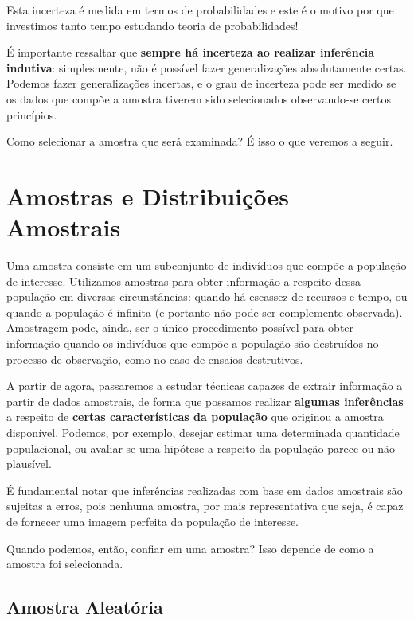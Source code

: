 \documentclass[
]{book}
\theoremstyle{definition}
\theoremstyle{definition}
\theoremstyle{definition}
\theoremstyle{remark}
\begin{document}
Esta incerteza é medida em termos de probabilidades e este é o motivo por que investimos tanto tempo estudando teoria de probabilidades!

É importante ressaltar que \textbf{sempre há incerteza ao realizar inferência indutiva}:
simplesmente, não é possível fazer generalizações absolutamente certas. Podemos fazer generalizações incertas, e o grau de incerteza pode ser medido se os dados que compõe a amostra tiverem sido selecionados observando-se certos princípios.

Como selecionar a amostra que será examinada? É isso o que veremos a seguir.

\hypertarget{amostras-e-distribuiuxe7uxf5es-amostrais}{%
\section{Amostras e Distribuições Amostrais}\label{amostras-e-distribuiuxe7uxf5es-amostrais}}

Uma amostra consiste em um subconjunto de indivíduos que compõe a população de interesse.
Utilizamos amostras para obter informação a respeito dessa população em diversas circunstâncias: quando há escassez de recursos e tempo, ou quando a população é infinita (e portanto não pode ser complemente observada). Amostragem pode, ainda, ser o único procedimento possível para obter informação quando os indivíduos que compõe a população são destruídos no processo de observação, como no caso de ensaios destrutivos.

A partir de agora, passaremos a estudar técnicas capazes de extrair informação a partir de dados amostrais, de forma que possamos realizar \textbf{algumas inferências} a respeito de \textbf{certas características da população} que originou a amostra disponível. Podemos, por exemplo, desejar estimar uma determinada quantidade populacional, ou avaliar se uma hipótese a respeito da população parece ou não plausível.

É fundamental notar que inferências realizadas com base em dados amostrais são sujeitas a erros, pois nenhuma amostra, por mais representativa que seja, é capaz de fornecer uma imagem perfeita da população de interesse.

Quando podemos, então, confiar em uma amostra? Isso depende de como a amostra foi selecionada.

\hypertarget{amostra-aleatuxf3ria}{%
\subsection*{Amostra Aleatória}\label{amostra-aleatuxf3ria}}
\end{document}
